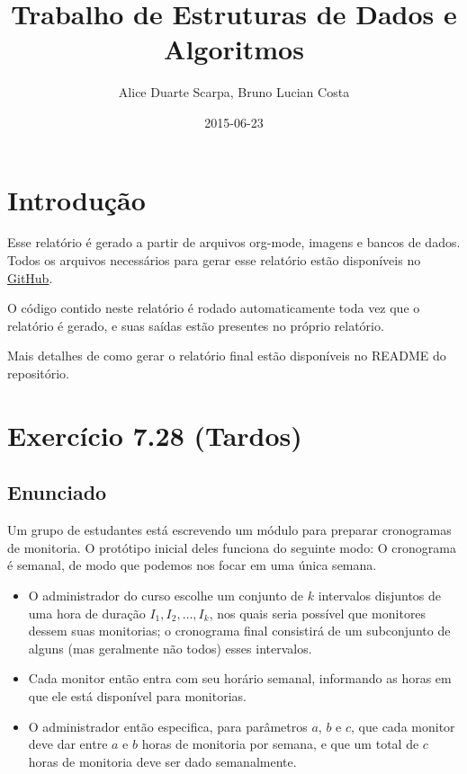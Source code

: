 \documentclass[11pt]{article}
\author{Alice Duarte Scarpa, Bruno Lucian Costa}
\date{2015-06-23}
\title{Trabalho de Estruturas de Dados e Algoritmos}
\begin{document}
\maketitle

\section{Introdução}
\label{sec-1}

Esse relatório é gerado a partir de arquivos org-mode, imagens e
bancos de dados. Todos os arquivos necessários para gerar esse
relatório estão disponíveis no \href{https://github.com/adusca/FGV-EDA}{GitHub}.

O código contido neste relatório é rodado automaticamente toda vez que
o relatório é gerado, e suas saídas estão presentes no próprio
relatório.

Mais detalhes de como gerar o relatório final estão disponíveis no
README do repositório.
\pagebreak

\section{Exercício 7.28 (Tardos)}
\label{sec-2}

\subsection{Enunciado}
\label{sec-2-1}

Um grupo de estudantes está escrevendo um módulo para preparar
cronogramas de monitoria. O protótipo inicial deles funciona do
seguinte modo: O cronograma é semanal, de modo que podemos nos focar
em uma única semana.

\begin{itemize}
\item O administrador do curso escolhe um conjunto de $k$
intervalos disjuntos de uma hora de duração $I_1, I_2, \ldots,
      I_k$, nos quais seria possível que monitores dessem suas
monitorias; o cronograma final consistirá de um subconjunto de
alguns (mas geralmente não todos) esses intervalos.
\item Cada monitor então entra com seu horário semanal, informando
as horas em que ele está disponível para monitorias.
\item O administrador então especifica, para parâmetros $a$, $b$ e
$c$, que cada monitor deve dar entre $a$ e $b$ horas de
monitoria por semana, e que um total de $c$ horas de monitoria
deve ser dado semanalmente.
\end{itemize}
\end{document}
